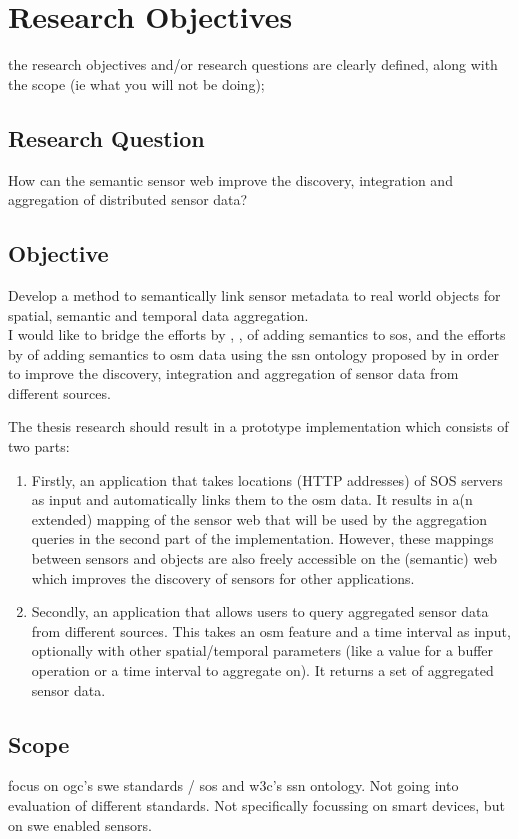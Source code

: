 
\chapter{Research Objectives}
\label{chap:objectives}

the research objectives and/or research questions are clearly defined, along with the scope (ie what you will not be doing);\\


\section{Research Question} 
How can the semantic sensor web improve the discovery, integration and aggregation of distributed sensor data?


\section{Objective} 
Develop a method to semantically link sensor metadata to real world objects for spatial, semantic and temporal data aggregation.\\

I would like to bridge the efforts by \cite{SSW:Henson}, \cite{SSW:Pschorr},  of adding semantics to \ac{sos}, and the efforts by \cite{LD:Auer} of adding semantics to \ac{osm} data using the \ac{ssn} ontology proposed by \cite{SSW:SSN_incubatorGroup} in order to improve the discovery, integration and aggregation of sensor data from different sources.

The thesis research should result in a prototype implementation which consists of two parts: 
\begin{enumerate}
	\item Firstly, an application that takes locations (HTTP addresses) of SOS servers as input and automatically links them to the \ac{osm} data. It results in a(n extended) mapping of the sensor web that will be used by the aggregation queries in the second part of the implementation. However, these mappings between sensors and objects are also freely accessible on the (semantic) web which improves the discovery of sensors for other applications.
	\item Secondly, an application that allows users to query aggregated sensor data from different sources. This takes an \ac{osm} feature and a time interval as input, optionally with other spatial/temporal parameters (like a value for a buffer operation or a time interval to aggregate on). It returns a set of aggregated sensor data. 
\end{enumerate}


\section{Scope} 
focus on \ac{ogc}'s \ac{swe} standards / \ac{sos} and \ac{w3c}'s \ac{ssn} ontology. Not going into evaluation of different standards. Not specifically focussing on smart devices, but on \ac{swe} enabled sensors.